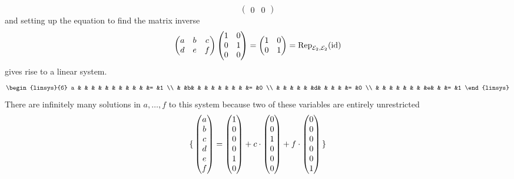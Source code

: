 \begin{exercises}
\begin{answer}
\begin{equation*}
\begin{pmatrix}
          0  &0 
        \end{pmatrix}
      \end{equation*}
      and setting up the equation to find the matrix inverse
      \begin{equation*}
        \begin{pmatrix}
          a &b &c \\
          d &e &f
        \end{pmatrix}
        \begin{pmatrix}
          1 &0  \\
          0 &1  \\
          0 &0
        \end{pmatrix}
        =\begin{pmatrix}
          1 &0  \\
          0 &1 
        \end{pmatrix}
        ={\rm Rep}_{{\cal E}_2,{\cal E}_2}(\mbox{id})
      \end{equation*}
      gives rise to a linear system.
      \begin{equation*}
        \begin{linsys}{6}
          a & & & & & & & & & & &= &1 \\
            & &b& & & & & & & & &= &0 \\
            & & & & & &d& & & & &= &0 \\
            & & & & & & & &e& & &= &1 
        \end{linsys}
      \end{equation*}
      There are infinitely many solutions in $a,\ldots,f$ 
      to this system because two of these variables are entirely unrestricted
      \begin{equation*}
        \mbox{$\{\,\begin{pmatrix} a \\ b \\ c \\ d \\ e \\ f \end{pmatrix}
             =\begin{pmatrix} 1 \\ 0 \\ 0 \\ 0 \\ 1 \\ 0 \end{pmatrix}
              +c\cdot \begin{pmatrix} 0 \\ 0 \\ 1 \\ 0 \\ 0 \\ 0 \end{pmatrix}
              +f\cdot \begin{pmatrix} 0 \\ 0 \\ 0 \\ 0 \\ 0 \\ 1 \end{pmatrix}
\,\}$}
\end{equation*}
\end{answer}
\end{exercises}
